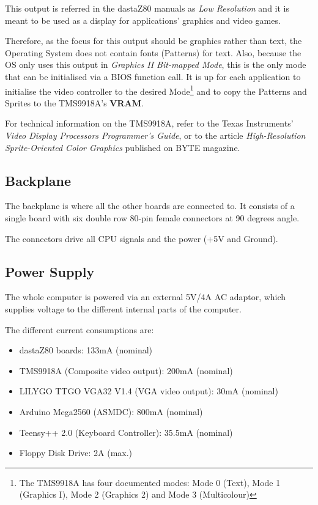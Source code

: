 \documentclass[a4paper,11pt]{article}
\begin{document}
    This output is referred in the dastaZ80 manuals as \textit{Low Resolution}
    and it is meant to be used as a display for applications' graphics and video
    games.

    Therefore, as the focus for this output should be graphics rather than text,
    the Operating System does not contain fonts (Patterns) for text. Also,
    because the OS only uses this output in \textit{Graphics II Bit-mapped Mode},
    this is the only mode that can be initialised via a BIOS function call. It
    is up for each application to initialise the video controller to the desired
    Mode\footnote{The TMS9918A has four documented modes: Mode 0 (Text), Mode 1
    (Graphics I), Mode 2 (Graphics 2) and Mode 3 (Multicolour)} and to copy the
    Patterns and Sprites to the TMS9918A's \textbf{VRAM}.

    For technical information on the TMS9918A, refer to the Texas Instruments'
    \textit{Video Display Processors Programmer's Guide}\cite{ti1}, or to the article
    \textit{High-Resolution Sprite-Oriented Color Graphics}\cite{ciarcia2}
    published on BYTE magazine.

    \subsection{Backplane}

    The backplane is where all the other boards are connected to. It consists
    of a single board with six double row 80-pin female connectors at 90 degrees
    angle.

    The connectors drive all CPU signals and the power (+5V and Ground).

    \subsection{Power Supply}

    The whole computer is powered via an external 5V/4A AC adaptor, which
    supplies voltage to the different internal parts of the computer.

    The different current consumptions are:

    \begin{itemize}
        \item dastaZ80 boards: 133mA (nominal)
        \item TMS9918A (Composite video output): 200mA (nominal)
        \item LILYGO TTGO VGA32 V1.4 (VGA video output): 30mA (nominal)
        \item Arduino Mega2560 (ASMDC): 800mA (nominal)
        \item Teensy++ 2.0 (Keyboard Controller): 35.5mA (nominal)
        \item Floppy Disk Drive: 2A (max.)
    \end{itemize}
\end{document}
